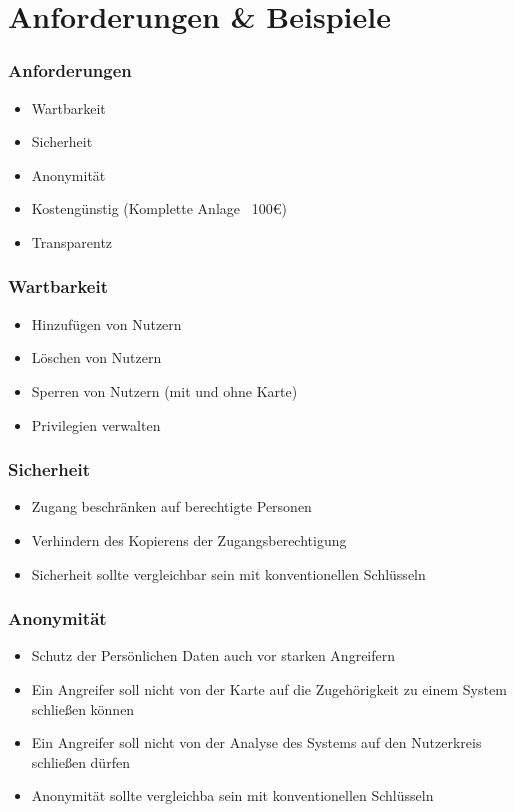 \section{Anforderungen \& Beispiele}
\begin{frame}
	\frametitle{Anforderungen}
	\begin{itemize}
		\item<2-> Wartbarkeit
		\item<3-> Sicherheit
		\item<4-> Anonymität
		\item<5-> Kostengünstig (Komplette Anlage ~100\euro{})
		\item<6-> Transparentz
	\end{itemize}
\end{frame}

\begin{frame}
	\frametitle{Wartbarkeit}
	\begin{itemize}
		\item<2-> Hinzufügen von Nutzern
		\item<3-> Löschen von Nutzern
		\item<4-> Sperren von Nutzern (mit und ohne Karte)
		\item<4-> Privilegien verwalten
	\end{itemize}
\end{frame}
\begin{frame}
	\frametitle{Sicherheit}
	\begin{itemize}
		\item<2-> Zugang beschränken auf berechtigte Personen
		\item<3-> Verhindern des Kopierens der Zugangsberechtigung
		\item<4-> Sicherheit sollte vergleichbar sein mit konventionellen Schlüsseln
	\end{itemize}
\end{frame}

\begin{frame}
	\frametitle{Anonymität}
	\begin{itemize}
		\item<2-> Schutz der Persönlichen Daten auch vor starken Angreifern
		\item<3-> Ein Angreifer soll nicht von der Karte auf die Zugehörigkeit zu einem System schließen können
		\item<4-> Ein Angreifer soll nicht von der Analyse des Systems auf den Nutzerkreis schließen dürfen
		\item<5-> Anonymität sollte vergleichba sein mit konventionellen Schlüsseln
	\end{itemize}
\end{frame}

